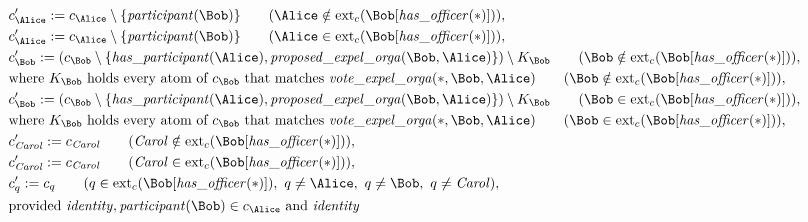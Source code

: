 \begin{align*}
&
c'_
{
\Alice
}
 := 
c_
{
\Alice
}
 \setminus 
\{
\mathit{\detokenize{
participant
}}
(
\Bob
)
\}
 \qquad (
\Alice
 \notin 
\mathrm{ext}_c(
\Bob
[
\mathit{\detokenize{
has_officer
}}
(
\ast
)
]
)
)
,\\
&
c'_
{
\Alice
}
 := 
c_
{
\Alice
}
 \setminus 
\{
\mathit{\detokenize{
participant
}}
(
\Bob
)
\}
 \qquad (
\Alice
 \in 
\mathrm{ext}_c(
\Bob
[
\mathit{\detokenize{
has_officer
}}
(
\ast
)
]
)
)
,\\
&
c'_
{
\Bob
}
 := 
(c_
{
\Bob
}
 \setminus 
\{
\mathit{\detokenize{
has_participant
}}
(
\Alice
)
,
\mathit{\detokenize{
proposed_expel_orga
}}
(
\Bob
,
\Alice
)
\}
) \setminus K_
{
\Bob
}
 \qquad (
\Bob
 \notin 
\mathrm{ext}_c(
\Bob
[
\mathit{\detokenize{
has_officer
}}
(
\ast
)
]
)
)
,\\
&
\text{where } K_
{
\Bob
}
 \text{ holds every atom of } c_
{
\Bob
}
 \text{ that matches } 
\mathit{\detokenize{
vote_expel_orga
}}
(
\ast
,
\Bob
,
\Alice
)
 \qquad (
\Bob
 \notin 
\mathrm{ext}_c(
\Bob
[
\mathit{\detokenize{
has_officer
}}
(
\ast
)
]
)
)
,\\
&
c'_
{
\Bob
}
 := 
(c_
{
\Bob
}
 \setminus 
\{
\mathit{\detokenize{
has_participant
}}
(
\Alice
)
,
\mathit{\detokenize{
proposed_expel_orga
}}
(
\Bob
,
\Alice
)
\}
) \setminus K_
{
\Bob
}
 \qquad (
\Bob
 \in 
\mathrm{ext}_c(
\Bob
[
\mathit{\detokenize{
has_officer
}}
(
\ast
)
]
)
)
,\\
&
\text{where } K_
{
\Bob
}
 \text{ holds every atom of } c_
{
\Bob
}
 \text{ that matches } 
\mathit{\detokenize{
vote_expel_orga
}}
(
\ast
,
\Bob
,
\Alice
)
 \qquad (
\Bob
 \in 
\mathrm{ext}_c(
\Bob
[
\mathit{\detokenize{
has_officer
}}
(
\ast
)
]
)
)
,\\
&
c'_
{
\mathit{Carol}
}
 := 
c_
{
\mathit{Carol}
}
 \qquad (
\mathit{Carol}
 \notin 
\mathrm{ext}_c(
\Bob
[
\mathit{\detokenize{
has_officer
}}
(
\ast
)
]
)
)
,\\
&
c'_
{
\mathit{Carol}
}
 := 
c_
{
\mathit{Carol}
}
 \qquad (
\mathit{Carol}
 \in 
\mathrm{ext}_c(
\Bob
[
\mathit{\detokenize{
has_officer
}}
(
\ast
)
]
)
)
,\\
&
c'_
q
 := 
c_
q
 \qquad (
q
 \in 
\mathrm{ext}_c(
\Bob
[
\mathit{\detokenize{
has_officer
}}
(
\ast
)
]
)
,\ 
q \neq 
\Alice
,\ 
q \neq 
\Bob
,\ 
q \neq 
\mathit{Carol}
)
,\\
&
\text{provided } 
\mathit{\detokenize{
identity
}}
,
\mathit{\detokenize{
participant
}}
(
\Bob
)
 \in c_
{
\Alice
}
 \text{ and } 
\mathit{\detokenize{
identity
}}
\end{align*}
